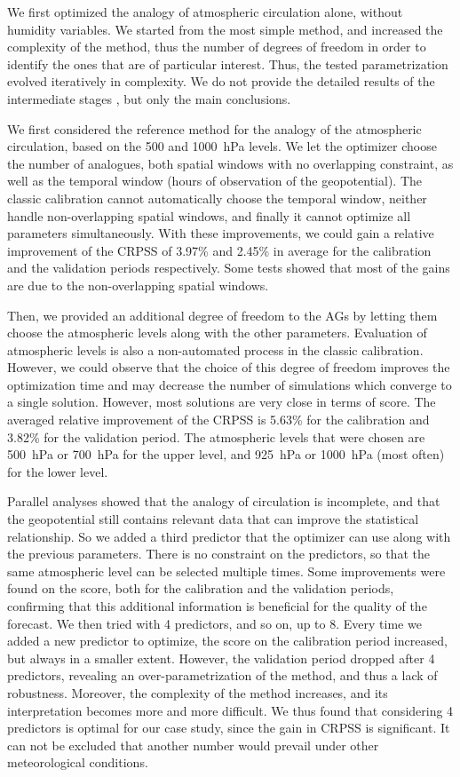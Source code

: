 \documentclass[twocol]{ametsoc}
\begin{document}
We first optimized the analogy of atmospheric circulation alone, without humidity variables. We started from the most simple method, and increased the complexity of the method, thus the number of degrees of freedom in order to identify the ones that are of particular interest. Thus, the tested parametrization evolved iteratively in complexity. We do not provide the detailed results of the intermediate stages \citep[see][for the details]{Horton2012a}, but only the main conclusions.

We first considered the reference method for the analogy of the atmospheric circulation, based on the 500 and 1000~hPa levels. We let the optimizer choose the number of analogues, both spatial windows with no overlapping constraint, as well as the temporal window (hours of observation of the geopotential). The classic calibration cannot automatically choose the temporal window, neither handle non-overlapping spatial windows, and finally it cannot optimize all parameters simultaneously. With these improvements, we could gain a relative improvement of the CRPSS of 3.97\% and 2.45\% in average for the calibration and the validation periods respectively. Some tests showed that most of the gains are due to the non-overlapping spatial windows.

Then, we provided an additional degree of freedom to the AGs by letting them choose the atmospheric levels along with the other parameters. Evaluation of atmospheric levels is also a non-automated process in the classic calibration. However, we could observe that the choice of this degree of freedom improves the optimization time and may decrease the number of simulations which converge to a single solution. However, most solutions are very close in terms of score. The averaged relative improvement of the CRPSS is 5.63\% for the calibration and 3.82\% for the validation period. The atmospheric levels that were chosen are 500~hPa or 700~hPa for the upper level, and 925~hPa or 1000~hPa (most often) for the lower level.

Parallel analyses showed that the analogy of circulation is incomplete, and that the geopotential still contains relevant data that can improve the statistical relationship. So we added a third predictor that the optimizer can use along with the previous parameters. There is no constraint on the predictors, so that the same atmospheric level can be selected multiple times. Some improvements were found on the score, both for the calibration and the validation periods, confirming that this additional information is beneficial for the quality of the forecast. We then tried with 4 predictors, and so on, up to 8. Every time we added a new predictor to optimize, the score on the calibration period increased, but always in a smaller extent. However, the validation period dropped after 4 predictors, revealing an over-parametrization of the method, and thus a lack of robustness. Moreover, the complexity of the method increases, and its interpretation becomes more and more difficult. We thus found that considering 4 predictors is optimal for our case study, since the gain in CRPSS is significant. It can not be excluded that another number would prevail under other meteorological conditions.
\end{document}

